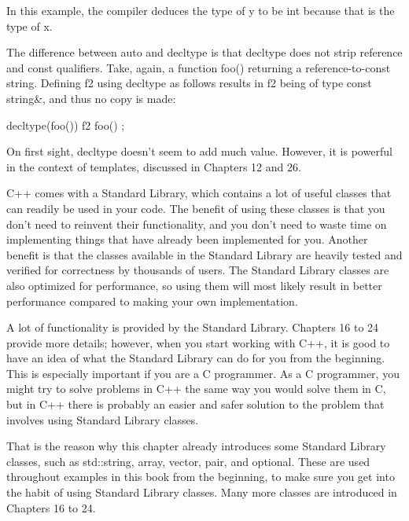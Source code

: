 In this example, the compiler deduces the type of y to be int because that is the type of x.

The difference between auto and decltype is that decltype does not strip reference and const qualifiers. Take, again, a function foo() returning a reference-to-const string. Defining f2 using decltype as follows results in f2 being of type const string\&, and thus no copy is made:

\begin{cpp}
decltype(foo()) f2 { foo() };
\end{cpp}

On first sight, decltype doesn’t seem to add much value. However, it is powerful in the context of templates, discussed in Chapters 12 and 26.


C++ comes with a Standard Library, which contains a lot of useful classes that can readily be used in your code. The benefit of using these classes is that you don’t need to reinvent their functionality, and you don’t need to waste time on implementing things that have already been implemented for you. Another benefit is that the classes available in the Standard Library are heavily tested and verified for correctness by thousands of users. The Standard Library classes are also optimized for performance, so using them will most likely result in better performance compared to making your own implementation.

A lot of functionality is provided by the Standard Library. Chapters 16 to 24 provide more details; however, when you start working with C++, it is good to have an idea of what the Standard Library can do for you from the beginning. This is especially important if you are a C programmer. As a C programmer, you might try to solve problems in C++ the same way you would solve them in C, but in C++ there is probably an easier and safer solution to the problem that involves using Standard Library classes.

That is the reason why this chapter already introduces some Standard Library classes, such as std::string, array, vector, pair, and optional. These are used throughout examples in this book from the beginning, to make sure you get into the habit of using Standard Library classes. Many more classes are introduced in Chapters 16 to 24.






